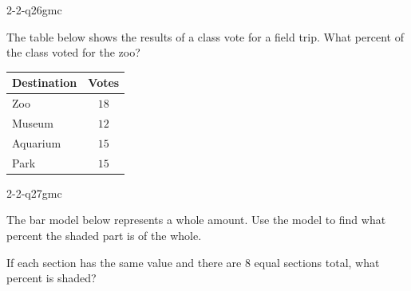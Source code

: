 
\begin{practiceQuestion}{2-2-q26}{gmc}
\begin{questionText}
The table below shows the results of a class vote for a field trip. What percent of the class voted for the zoo?

\begin{center}
\begin{tabular}{|l|c|}
\hline
\textbf{Destination} & \textbf{Votes} \\
\hline
Zoo & $18$ \\
\hline
Museum & $12$ \\
\hline
Aquarium & $15$ \\
\hline
Park & $15$ \\
\hline
\end{tabular}
\end{center}
\end{questionText}
\end{practiceQuestion}

\begin{practiceQuestion}{2-2-q27}{gmc}
\begin{questionText}
The bar model below represents a whole amount. Use the model to find what percent the shaded part is of the whole.

\begin{center}
\end{center}

If each section has the same value and there are $8$ equal sections total, what percent is shaded?
\end{questionText}
\end{practiceQuestion}

